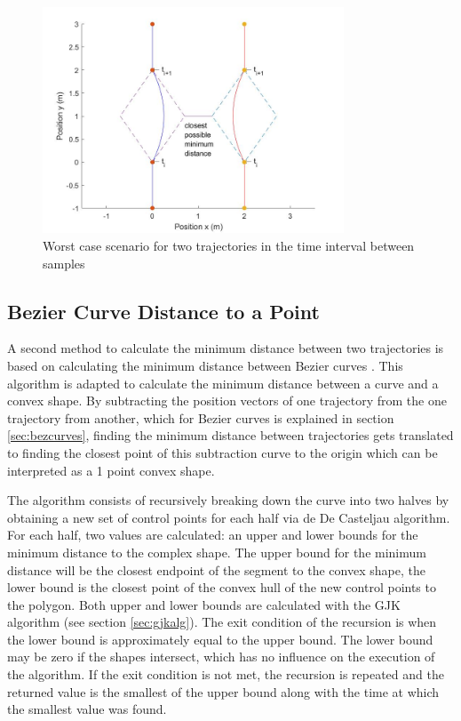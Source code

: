 \begin{figure}
\centering
\includegraphics[width=0.8\textwidth]{Images/theworstcasescenario.jpg}
\caption{Worst case scenario for two trajectories in the time interval between samples}
\label{fig:theworstcasescenario}
\end{figure}


\subsection{Bezier Curve Distance to a Point}
\label{sec:bezcurvetopoint}

\par A second method to calculate the minimum distance between two trajectories is based on calculating the minimum distance between Bezier curves \cite{chang2011computation}. This algorithm is adapted to calculate the minimum distance between a curve and a convex shape. By subtracting the position vectors of one trajectory from the one trajectory from another, which for Bezier curves is explained in section \ref{sec:bezcurves}, finding the minimum distance between trajectories gets translated to finding the closest point of this subtraction curve to the origin which can be interpreted as a 1 point convex shape.
\par The algorithm consists of recursively breaking down the curve into two halves by obtaining a new set of control points for each half via de De Casteljau algorithm. For each half, two values are calculated: an upper and lower bounds for the minimum distance to the complex shape. The upper bound for the minimum distance will be the closest endpoint of the segment to the convex shape, the lower bound is the closest point of the convex hull of the new control points to the polygon. Both upper and lower bounds are calculated with the \acs{GJK} algorithm (see section \ref{sec:gjkalg}). The exit condition of the recursion is when the lower bound is approximately equal to the upper bound. The lower bound may be zero if the shapes intersect, which has no influence on the execution of the algorithm. If the exit condition is not met, the recursion is repeated and the returned value is the smallest of the upper bound along with the time at which the smallest value was found.

